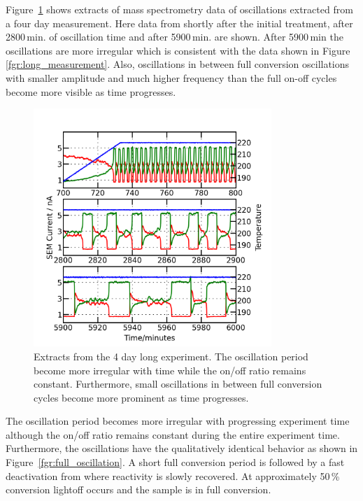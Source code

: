\documentclass[8.5pt,twoside,twocolumn]{article}
\begin{document}
Figure~\ref{fgr:extracts} shows extracts of mass spectrometry data of oscillations extracted from a four day measurement. Here data from shortly after the initial treatment, after 2800\,min. of oscillation time and after 5900\,min. are shown. After 5900\,min the oscillations are more irregular which is consistent with the data shown in Figure \ref{fgr:long_measurement}. Also, oscillations in between full conversion oscillations with smaller amplitude and much higher frequency than the full on-off cycles become more visible as time progresses.
\begin{figure}[h]
  \centering
  \includegraphics[width=9cm]{extracts_from_very_long_oscillation.png}
  \caption{Extracts from the 4 day long experiment. The oscillation period become more irregular with time while the on/off ratio remains constant. Furthermore, small oscillations in between full conversion cycles become more prominent as time progresses.}
  \label{fgr:extracts}
\end{figure}

The oscillation period becomes more irregular with progressing experiment time although the on/off ratio remains constant during the entire experiment time. Furthermore, the oscillations have the qualitatively identical behavior as shown in Figure~\ref{fgr:full_oscillation}. A short full conversion period is followed by a fast deactivation from where reactivity is slowly recovered. At approximately 50\,\% conversion lightoff occurs and the sample is in full conversion.
\end{document}
